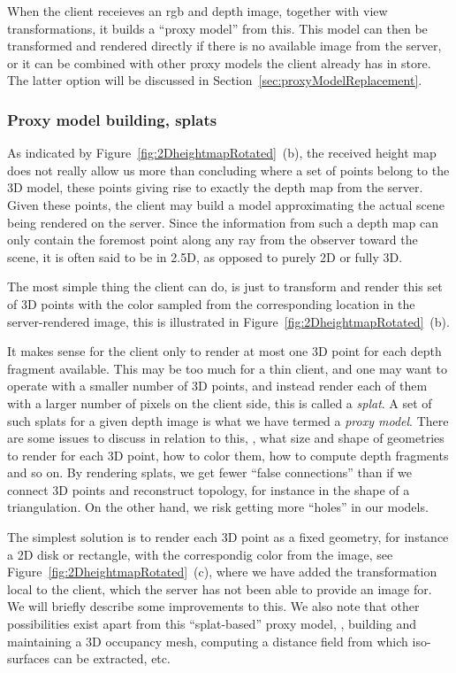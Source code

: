 When the client receieves an rgb and depth image, together with view
transformations, it builds a ``proxy model'' from this. This model can then be
transformed and rendered directly if there is no available image from the
server, or it can be combined with other proxy models the client already has in
store. The latter option will be discussed in
Section~\ref{sec:proxyModelReplacement}.


\subsubsection{Proxy model building, splats}

As indicated by Figure~\ref{fig:2DheightmapRotated}~(b), the received
height map does not really allow us more than concluding where a set of points
belong to the 3D model, these points giving rise to exactly the depth map from
the server. Given these points, the client may build a model approximating the
actual scene being rendered on the server. Since the information from such a
depth map can only contain the foremost point along any ray from the observer
toward the scene, it is often said to be in 2.5D, as opposed to purely 2D or
fully 3D.

The most simple thing the client can do, is just to transform and render this
set of 3D points with the color sampled from the corresponding location in the
server-rendered image, this is illustrated in
Figure~\ref{fig:2DheightmapRotated}~(b).

It makes sense for the client only to render at most one 3D point for each depth
fragment available. This may be too much for a thin client, and one may want to
operate with a smaller number of 3D points, and instead render each of them with
a larger number of pixels on the client side, this is called a {\em splat}. A
set of such splats for a given depth image is what we have termed a {\em proxy
model}. There are some issues to discuss in relation to this, \eg, what size and
shape of geometries to render for each 3D point, how to color them, how to
compute depth fragments and so on.  By rendering splats, we get fewer ``false
connections'' than if we connect 3D points and reconstruct topology, for
instance in the shape of a triangulation. On the other hand, we risk getting
more ``holes'' in our models.

The simplest solution is to render each 3D point as a fixed geometry, for
instance a 2D disk or rectangle, with the correspondig color from the image, see
Figure~\ref{fig:2DheightmapRotated}~(c), where we have added the transformation
local to the client, which the server has not been able to provide an image for.
We will briefly describe some improvements to this. We also note that other
possibilities exist apart from this ``splat-based'' proxy model, \eg, building
and maintaining a 3D occupancy mesh, computing a distance field from which
iso-surfaces can be extracted, etc.


